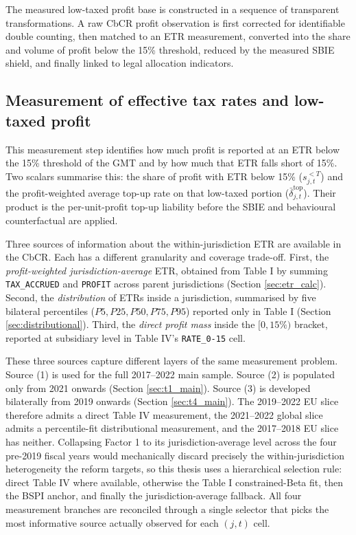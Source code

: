 \documentclass[11pt,a4paper]{article}
\newcommand{\code}[1]{\texttt{#1}}
\begin{document}
The measured low-taxed profit base is constructed in a sequence of transparent transformations. A raw CbCR profit observation is first corrected for identifiable double counting, then matched to an ETR measurement, converted into the share and volume of profit below the 15\% threshold, reduced by the measured SBIE shield, and finally linked to legal allocation indicators. 

\subsection{Measurement of effective tax rates and low-taxed profit}\label{sec:etr_measurement}

This measurement step identifies how much profit is reported at an ETR below the 15\% threshold of the GMT and by how much that ETR falls short of 15\%. Two scalars summarise this: the share of profit with ETR below 15\% ($s_{j,t}^{<T}$) and the profit-weighted average top-up rate on that low-taxed portion ($\bar{\delta}_{j,t}^{\text{top}}$). Their product is the per-unit-profit top-up liability before the SBIE and behavioural counterfactual are applied.

Three sources of information about the within-jurisdiction ETR are available in the CbCR. Each has a different granularity and coverage trade-off. First, the \emph{profit-weighted jurisdiction-average} ETR, obtained from Table I by summing \code{TAX\_ACCRUED} and \code{PROFIT} across parent jurisdictions (Section \ref{sec:etr_calc}). Second, the \emph{distribution} of ETRs inside a jurisdiction, summarised by five bilateral percentiles ($P5, P25, P50, P75, P95$) reported only in Table I (Section \ref{sec:distributional}). Third, the \emph{direct profit mass} inside the $[0, 15\%)$ bracket, reported at subsidiary level in Table IV's \code{RATE\_0-15} cell.

These three sources capture different layers of the same measurement problem. Source (1) is used for the full 2017--2022 main sample. Source (2) is populated only from 2021 onwards (Section \ref{sec:t1_main}). Source (3) is developed bilaterally from 2019 onwards (Section \ref{sec:t4_main}). The 2019--2022 EU slice therefore admits a direct Table IV measurement, the 2021--2022 global slice admits a percentile-fit distributional measurement, and the 2017--2018 EU slice has neither. Collapsing Factor 1 to its jurisdiction-average level across the four pre-2019 fiscal years would mechanically discard precisely the within-jurisdiction heterogeneity the reform targets, so this thesis uses a hierarchical selection rule: direct Table IV where available, otherwise the Table I constrained-Beta fit, then the BSPI anchor, and finally the jurisdiction-average fallback. All four measurement branches are reconciled through a single selector that picks the most informative source actually observed for each $(j,t)$ cell.
\end{document}
